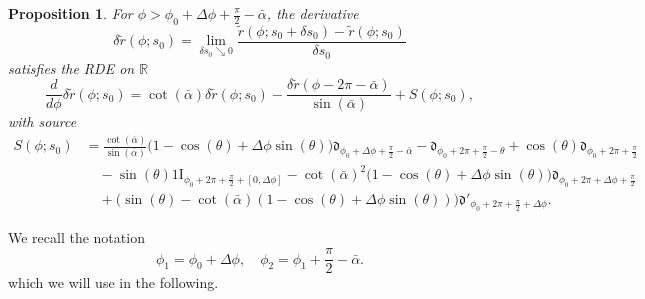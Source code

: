 \documentclass[reqno]{amsart}
\theoremstyle{definition} \newtheorem{definition}{Definition}[section]
\theoremstyle{definition} \newtheorem{remark}[definition]{Remark}
\theoremstyle{plain} \newtheorem{lemma}[definition]{Lemma}
\theoremstyle{plain} \newtheorem{proposition}[definition]{Proposition}
\theoremstyle{plain} \newtheorem{theorem}[definition]{Theorem}
\theoremstyle{plain} \newtheorem{corollary}[definition]{Corollary}
\theoremstyle{definition} \newtheorem{example}[definition]{Example}
\theoremstyle{plain} \newtheorem{claim}[clai]{Claim}
\theoremstyle{definition} \newtheorem{assumption}[definition]{Assumption}
\theoremstyle{definition} \newtheorem{observation}[definition]{Observation}
\newcommand{\R}{\mathbb{R}}
\newcommand{\ind}{1\!\!\mathrm{I}}
\newcommand{\1}{\mathbbm 1}
\newcommand{\Diracd}{\mathfrak{d}}
\numberwithin{equation}{section} %
\theoremstyle{plain} \newtheorem*{theorem*}{Theorem}
\theoremstyle{plain} \newtheorem{mthm}[maintheorem]{Main Theorem}
\theoremstyle{plain} \newtheorem*{mthm*}{Main Theorem}
\theoremstyle{plain} \newtheorem*{conjecture*}{Conjecture}
\theoremstyle{plain} \newtheorem{conjecture}[definition]{Conjecture}
\theoremstyle{plain} \newtheorem*{problem*}{Problem}
\begin{document}
\begin{proposition}
\label{Prop:equa_delta_tilde_r_arc}
For $\phi >  \phi_0 + \Delta\phi+\frac{\pi}{2}- \bar \alpha$, the derivative
$$
\delta \tilde r(\phi;s_0) = \lim_{\delta s_0 \searrow 0} \frac{\tilde r(\phi;s_0 + \delta s_0) - \tilde r(\phi;s_0)}{\delta s_0}
$$
satisfies the RDE on $\R$
\begin{equation*}
\frac{d}{d\phi} \delta \tilde r(\phi;s_0) = \cot(\bar \alpha) \delta \tilde r(\phi;s_0) - \frac{\delta \tilde r(\phi - 2\pi - \bar \alpha)}{\sin(\bar \alpha)} + S(\phi;s_0),
\end{equation*}
with source
\begin{align*}
S(\phi;s_0) &= \frac{\cot(\bar \alpha)}{\sin(\bar \alpha)} \big( 1 - \cos(\theta) + \Delta \phi \sin(\theta) \big) \Diracd_{\phi_0 + \Delta \phi + \frac{\pi}{2} - \bar \alpha} - \Diracd_{\phi_0 + 2\pi + \frac{\pi}{2} - \theta} + \cos(\theta) \Diracd_{\phi_0 + 2\pi + \frac{\pi}{2}} \\
& \quad - \sin(\theta) \ind_{\phi_0 + 2\pi + \frac{\pi}{2} + [0,\Delta \phi]} - \cot(\bar \alpha)^2 \big( 1 - \cos(\theta) + \Delta \phi \sin(\theta) \big) \Diracd_{\phi_0 + 2\pi + \Delta \phi + \frac{\pi}{2}} \\
& \quad + \big( \sin(\theta) - \cot(\bar \alpha) (1 - \cos(\theta) + \Delta \phi \sin(\theta)) \big) \Diracd'_{\phi_0 + 2\pi + \frac{\pi}{2} + \Delta \phi}.
\end{align*}
\end{proposition}

We recall the notation
$$
\phi_1 = \phi_0 + \Delta \phi, \quad \phi_2 = \phi_1 + \frac{\pi}{2} -\bar \alpha.
$$
which we will use in the following.
\end{document}
